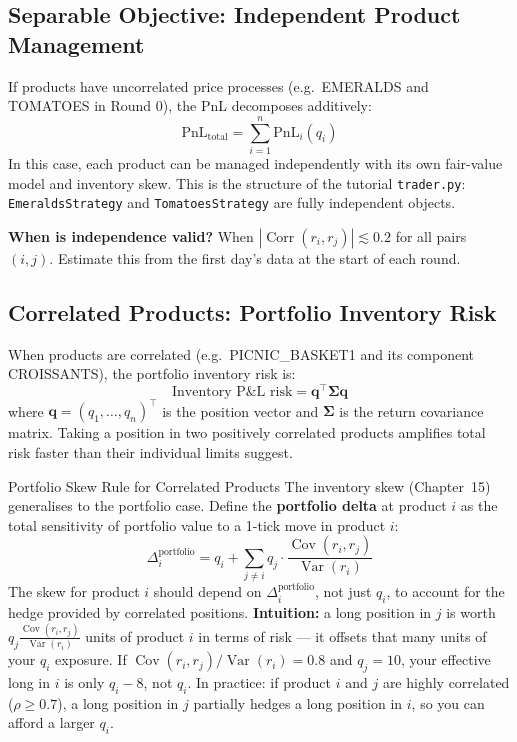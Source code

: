 \documentclass[12pt,a4paper,openany]{report}
\theoremstyle{definition}
\newcommand{\Var}{\operatorname{Var}}
\newcommand{\Cov}{\operatorname{Cov}}
\newcommand{\Corr}{\operatorname{Corr}}
\begin{document}
\subsection{Separable Objective: Independent Product Management}

If products have uncorrelated price processes (e.g.\ EMERALDS and TOMATOES in Round 0), the PnL decomposes additively:
\[
  \text{PnL}_{\text{total}} = \sum_{i=1}^n \text{PnL}_i(q_i)
\]
In this case, each product can be managed independently with its own fair-value model and inventory skew. This is the structure of the tutorial \texttt{trader.py}: \texttt{EmeraldsStrategy} and \texttt{TomatoesStrategy} are fully independent objects.

\textbf{When is independence valid?} When $|\Corr(r_i, r_j)| \lesssim 0.2$ for all pairs $(i, j)$. Estimate this from the first day's data at the start of each round.

\subsection{Correlated Products: Portfolio Inventory Risk}

When products are correlated (e.g.\ PICNIC\_BASKET1 and its component CROISSANTS), the portfolio inventory risk is:
\[
  \text{Inventory P\&L risk} = \mathbf{q}^{\top} \boldsymbol{\Sigma} \mathbf{q}
\]
where $\mathbf{q} = (q_1, \ldots, q_n)^{\top}$ is the position vector and $\boldsymbol{\Sigma}$ is the return covariance matrix. Taking a position in two positively correlated products amplifies total risk faster than their individual limits suggest.

\begin{keyconceptbox}{Portfolio Skew Rule for Correlated Products}
The inventory skew (Chapter~15) generalises to the portfolio case. Define the \textbf{portfolio delta} at product $i$ as the total sensitivity of portfolio value to a 1-tick move in product $i$:
\[
  \Delta_i^{\text{portfolio}} = q_i + \sum_{j \neq i} q_j \cdot \frac{\Cov(r_i, r_j)}{\Var(r_i)}
\]
The skew for product $i$ should depend on $\Delta_i^{\text{portfolio}}$, not just $q_i$, to account for the hedge provided by correlated positions. \textbf{Intuition:} a long position in $j$ is worth $q_j \frac{\Cov(r_i,r_j)}{\Var(r_i)}$ units of product $i$ in terms of risk — it offsets that many units of your $q_i$ exposure. If $\Cov(r_i,r_j)/\Var(r_i) = 0.8$ and $q_j = 10$, your effective long in $i$ is only $q_i - 8$, not $q_i$. In practice: if product $i$ and $j$ are highly correlated ($\rho \geq 0.7$), a long position in $j$ partially hedges a long position in $i$, so you can afford a larger $q_i$.
\end{keyconceptbox}
\end{document}
